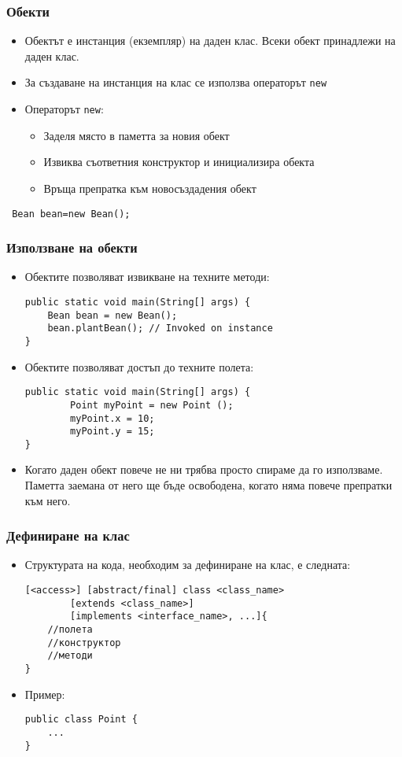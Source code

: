 \documentclass[ignorenonframetext, hyperref=unicode,compress]{beamer}
\begin{document}
\begin{frame}[containsverbatim]\frametitle{Обекти}
\begin{itemize}
 \item Обектът е инстанция (екземпляр) на даден клас. Всеки обект принадлежи на даден клас.
 \item За създаване на инстанция на клас се използва операторът \lstinline{new}
 \item Операторът \lstinline{new}:
 \begin{itemize}
  \item Заделя място в паметта за новия обект
  \item Извиква съответния конструктор и инициализира обекта
  \item Връща препратка към новосъздадения обект
 \end{itemize}
\end{itemize}

\begin{lstlisting}
 Bean bean=new Bean();
\end{lstlisting}
\end{frame}

\begin{frame}[containsverbatim]\frametitle{Използване на обекти}
\begin{itemize}
 \item 
Обектите позволяват извикване на техните методи:
\begin{lstlisting}
public static void main(String[] args) {
	Bean bean = new Bean();
	bean.plantBean(); // Invoked on instance
}
\end{lstlisting}
\item
Обектите позволяват достъп до техните полета:
\begin{lstlisting}
public static void main(String[] args) {
		Point myPoint = new Point ();
		myPoint.x = 10;
		myPoint.y = 15;
}
\end{lstlisting}
\item Когато даден обект повече не ни трябва просто спираме да го използваме. Паметта заемана от него ще бъде освободена, когато няма повече препратки към него.
\end{itemize}

\end{frame}


\begin{frame}[containsverbatim]\frametitle{Дефиниране на клас}
\begin{itemize}
 \item 
Структурата на кода, необходим за дефиниране на клас, е следната:
\begin{lstlisting}
[<access>] [abstract/final] class <class_name>
		[extends <class_name>]
		[implements <interface_name>, ...]{
	//полета
	//конструктор
	//методи
}
\end{lstlisting}
\item Пример:
\begin{lstlisting}
public class Point {
	...
}
\end{lstlisting}
\end{itemize}
\end{frame}
\end{document}
